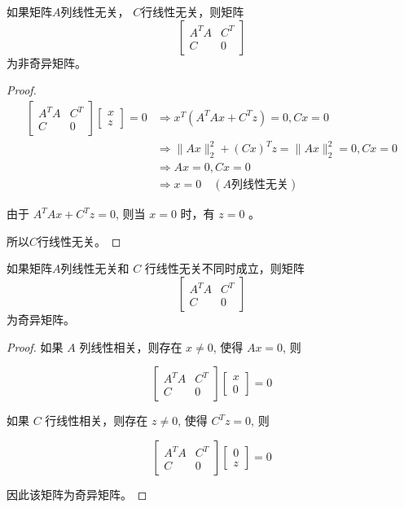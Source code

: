 \begin{theorem}
    如果矩阵$A$列线性无关， $C$行线性无关，则矩阵
$$
\left[\begin{array}{cc}
A^{T} A & C^{T} \\
{C} & 0
\end{array}\right]
$$
为非奇异矩阵。  
\end{theorem}

\begin{proof}
    $$ \begin{aligned}\left[\begin{array}{cc}A^{T} A & C^{T} \\ {C} & 0\end{array}\right]\left[\begin{array}{c}x \\ z\end{array}\right]=0 & \Rightarrow x^{T}\left(A^{T} A x+C^{T} z\right)=0, C x=0 \\ & \Rightarrow\|A x\|_{2}^{2}+(C x)^{T} z=\|A x\|_{2}^{2}=0, C x=0 \\ & \Rightarrow A x=0, C x=0 \\ & \Rightarrow x=0 \quad (A\text {列线性无关}) \end{aligned} $$

    由于 $ A^{T} A x+C^{T} {z}=0 $, 则当 $ x=0 $ 时，有 $ {z}=0 $ 。 
    
    所以$C$行线性无关。
\end{proof}

\begin{theorem}
    如果矩阵$A$列线性无关和 $ C $ 行线性无关不同时成立，则矩阵
$$
\left[\begin{array}{cc}
A^{T} A & C^{T} \\
{C} & 0
\end{array}\right]
$$
为奇异矩阵。
\end{theorem}

\begin{proof}
    如果 $ {A} $ 列线性相关，则存在 $ x \neq 0 $, 使得 $ A x=0 $, 则

    $$
    \left[\begin{array}{cc}
    A^{T} A & C^{T} \\
    {C} & 0
    \end{array}\right]\left[\begin{array}{l}
    x \\
    0
    \end{array}\right]=0
    $$

    如果 $ C $ 行线性相关，则存在 $ z \neq 0 $, 使得 $ C^{T} z=0 $, 则

    $$
    \left[\begin{array}{cc}
    A^{T} A & C^{T} \\
    {C} & 0
    \end{array}\right]\left[\begin{array}{l}
    0 \\
    {z}
    \end{array}\right]=0
    $$

    因此该矩阵为奇异矩阵。
\end{proof}



